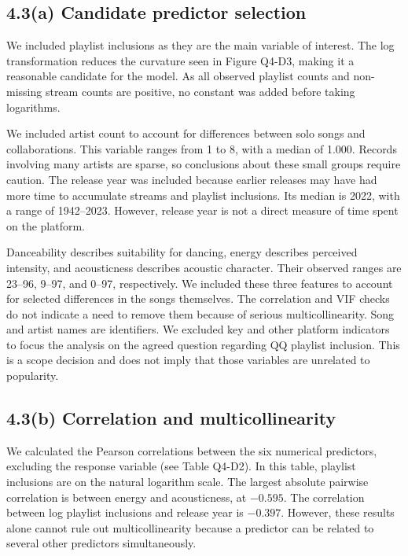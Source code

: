 \FloatBarrier
\subsection*{4.3(a) Candidate predictor selection}

We included playlist inclusions as they are the main variable of interest. The log transformation reduces the curvature seen in Figure Q4-D3, making it a reasonable candidate for the model. As all observed playlist counts and non-missing stream counts are positive, no constant was added before taking logarithms.

We included artist count to account for differences between solo songs and collaborations. This variable ranges from 1 to 8, with a median of 1.000. Records involving many artists are sparse, so conclusions about these small groups require caution. The release year was included because earlier releases may have had more time to accumulate streams and playlist inclusions. Its median is 2022, with a range of 1942--2023. However, release year is not a direct measure of time spent on the platform.

Danceability describes suitability for dancing, energy describes perceived intensity, and acousticness describes acoustic character. Their observed ranges are 23--96, 9--97, and 0--97, respectively. We included these three features to account for selected differences in the songs themselves. The correlation and VIF checks do not indicate a need to remove them because of serious multicollinearity. Song and artist names are identifiers. We excluded key and other platform indicators to focus the analysis on the agreed question regarding QQ playlist inclusion. This is a scope decision and does not imply that those variables are unrelated to popularity.

\FloatBarrier
\subsection*{4.3(b) Correlation and multicollinearity}

We calculated the Pearson correlations between the six numerical predictors, excluding the response variable (see Table Q4-D2). In this table, playlist inclusions are on the natural logarithm scale. The largest absolute pairwise correlation is between energy and acousticness, at $-0.595$. The correlation between log playlist inclusions and release year is $-0.397$. However, these results alone cannot rule out multicollinearity because a predictor can be related to several other predictors simultaneously.

